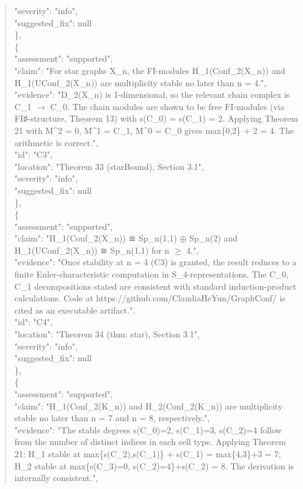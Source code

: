 \documentclass[11pt]{article}
\begin{document}
\begin{quote}
      "severity": "info",\\
      "suggested\_fix": null\\
    \},\\
    \{\\
      "assessment": "supported",\\
      "claim": "For star graphs X\_n, the FI-modules H\_1(Conf\_2(X\_n)) and H\_1(UConf\_2(X\_n)) are multiplicity stable no later than n = 4.",\\
      "evidence": "D\_2(X\_n) is 1-dimensional, so the relevant chain complex is C\_1 \ensuremath{\to} C\_0. The chain modules are shown to be free FI-modules (via FI♯-structure, Theorem 13) with s(C\_0) = s(C\_1) = 2. Applying Theorem 21 with M\^{}2 = 0, M\^{}1 = C\_1, M\^{}0 = C\_0 gives max\{0,2\} + 2 = 4. The arithmetic is correct.",\\
      "id": "C3",\\
      "location": "Theorem 33 (starBound), Section 3.1",\\
      "severity": "info",\\
      "suggested\_fix": null\\
    \},\\
    \{\\
      "assessment": "supported",\\
      "claim": "H\_1(Conf\_2(X\_n)) ≅ Sp\_n(1,1) \ensuremath{\oplus} Sp\_n(2) and H\_1(UConf\_2(X\_n)) ≅ Sp\_n(1,1) for n \ensuremath{\ge} 4.",\\
      "evidence": "Once stability at n = 4 (C3) is granted, the result reduces to a finite Euler-characteristic computation in S\_4-representations. The C\_0, C\_1 decompositions stated are consistent with standard induction-product calculations. Code at https://github.com/ClaudiaHeYun/GraphConf/ is cited as an executable artifact.",\\
      "id": "C4",\\
      "location": "Theorem 34 (thm: star), Section 3.1",\\
      "severity": "info",\\
      "suggested\_fix": null\\
    \},\\
    \{\\
      "assessment": "supported",\\
      "claim": "H\_1(Conf\_2(K\_n)) and H\_2(Conf\_2(K\_n)) are multiplicity stable no later than n = 7 and n = 8, respectively.",\\
      "evidence": "The stable degrees s(C\_0)=2, s(C\_1)=3, s(C\_2)=4 follow from the number of distinct indices in each cell type. Applying Theorem 21: H\_1 stable at max\{s(C\_2),s(C\_1)\} + s(C\_1) = max\{4,3\}+3 = 7; H\_2 stable at max\{s(C\_3)=0, s(C\_2)=4\}+s(C\_2) = 8. The derivation is internally consistent.",\\

\end{quote}
\end{document}
